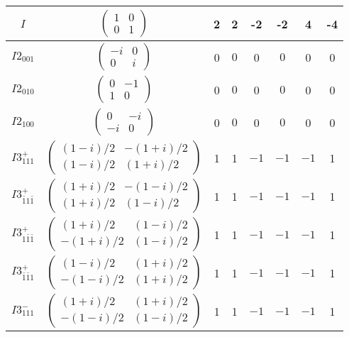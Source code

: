 \documentclass[3p,preprint]{elsarticle}
\begin{document}
\begin{table}[H]
	\begin{tabular}{|c|c||c|c|c|c|c|c|} \hline									
			$I$ & 				$\left(\begin{array}{cc} 1&0 \\ 0&1 \end{array}\right)$	& 2 &  2 &  -2 &  -2 &  4 &  -4 \\ \hline
			$I2_{001}$ &		$\left(\begin{array}{cc} -i&0 \\ 0&i \end{array}\right)$	& 0 & $0$ & 0 & $0$ & 0 & 0 \\ \hline
			$I2_{010}$ &		$\left(\begin{array}{cc} 0&-1 \\ 1&0 \end{array}\right)$	&0 & $0$ & 0 & $0$ & 0 & 0 \\ \hline
			$I2_{100}$ &		$\left(\begin{array}{cc} 0&-i \\ -i&0 \end{array}\right)$	& 0 & $0$ & 0 & $0$ & 0 & 0 \\ \hline
			$I3^{+}_{111}$ &		$\left(\begin{array}{cc} (1-i)/2&-(1+i)/2 \\ (1-i)/2&(1+i)/2 \end{array}\right)$	&1 & 1 & $-1$ & $-1$ & $-1$ & 1 \\ \hline
			$I3^{+}_{\bar{1}1\bar{1}}$ &		$\left(\begin{array}{cc} (1+i)/2&-(1-i)/2 \\ (1+i)/2&(1-i)/2 \end{array}\right)$	&1 & 1 & $-1$ & $-1$ & $-1$ & 1 \\ \hline
			$I3^{+}_{1\bar{1}\bar{1}}$ &		$\left(\begin{array}{cc} (1+i)/2&(1-i)/2 \\ -(1+i)/2&(1-i)/2 \end{array}\right)$	& 1 & 1 & $-1$ & $-1$ & $-1$ & 1 \\ \hline
			$I3^{+}_{\bar{1}\bar{1}1}$ &		$\left(\begin{array}{cc} (1-i)/2&(1+i)/2 \\ -(1-i)/2&(1+i)/2 \end{array}\right)$	&1 & 1 & $-1$ & $-1$ & $-1$ & 1 \\ \hline
			$I3^{-}_{111}$ &		$\left(\begin{array}{cc} (1+i)/2&(1+i)/2 \\ -(1-i)/2&(1-i)/2 \end{array}\right)$	&1 & 1 & $-1$ & $-1$ & $-1$ & 1 \\ \hline

\end{tabular}
\end{table}
\end{document}
